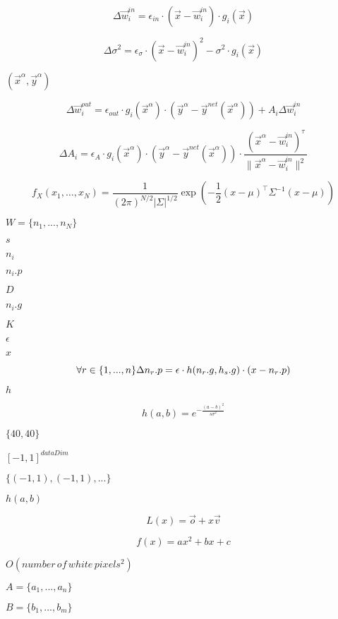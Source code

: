 \documentclass{article}
\begin{document}
\[ \Delta \vec{w}_i^{in} = \epsilon_{in} \cdot ( \vec{x} - \vec{w}_i^{in} ) \cdot g_i(\vec{x}) \]
\pagebreak

\[ \Delta \sigma^2 = \epsilon_{\sigma} \cdot ( \vec{x} - \vec{w}_i^{in} )^2 - \sigma^2 \cdot g_i(\vec{x}) \]
\pagebreak

$(\vec{x}^{\alpha},\vec{y}^{\alpha})$
\pagebreak

\[ \Delta \vec{w}_i^{out} = \epsilon_{out} \cdot g_i(\vec{x}^{\alpha}) \cdot (\vec{y}^{\alpha} - \vec{y}^{net}(\vec{x}^{\alpha}) ) + A_i \Delta \vec{w}_i^{in} \]
\pagebreak

\[ \Delta A_i = \epsilon_A \cdot g_i(\vec{x}^{\alpha}) \cdot (\vec{y}^{\alpha} - \vec{y}^{net}(\vec{x}^{\alpha}) ) \cdot \frac{(\vec{x}^{\alpha} - \vec{w}_i^{in} )^{\tau}}{\|\vec{x}^{\alpha} - \vec{w}_i^{in}\|^2} \]
\pagebreak

\[ f_X(x_1, \dots, x_N) = \frac {1} {(2\pi)^{N/2}|\Sigma|^{1/2}} \exp \left( -\frac{1}{2} ( x - \mu)^\top \Sigma^{-1} (x - \mu) \right) \]
\pagebreak

$W=\{n_1,...,n_N\}$
\pagebreak

$s$
\pagebreak

$n_i$
\pagebreak

$n_i.p$
\pagebreak

$D$
\pagebreak

$n_i.g$
\pagebreak

$K$
\pagebreak

$\epsilon$
\pagebreak

$x$
\pagebreak

\[ \forall r \in \{1,...,n\} \\ \Delta n_r.p = \epsilon \cdot h(n_r.g,h_s.g) \cdot (x-n_r.p) \]
\pagebreak

$h$
\pagebreak

\[ h(a,b) = e^{-\frac{(a-b)^2}{s\sigma^2}} \]
\pagebreak

$\{40,40\}$
\pagebreak

$[-1,1]^{dataDim}$
\pagebreak

$\{(-1,1),(-1,1),...\}$
\pagebreak

$h(a,b)$
\pagebreak

\[ L(x) = \vec{o} + x\vec{v} \]
\pagebreak

\[ f(x) = ax^2 + bx + c \]
\pagebreak

$ O(number\,of\,white\,pixels^2)$
\pagebreak

$A=\{a_1,...,a_n\}$
\pagebreak

$B=\{b_1,...,b_m\}$
\pagebreak
\end{document}
